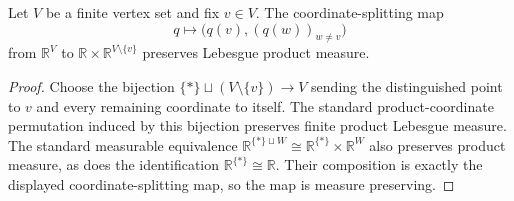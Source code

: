 \begin{helper}
Let \(V\) be a finite vertex set and fix \(v\in V\).  The coordinate-splitting
map
\[
q\longmapsto \bigl(q(v),(q(w))_{w\ne v}\bigr)
\]
from \(\mathbb R^V\) to \(\mathbb R\times\mathbb R^{V\setminus\{v\}}\)
preserves Lebesgue product measure.
\end{helper}
\begin{proof}
Choose the bijection \(\{\ast\}\sqcup (V\setminus\{v\})\to V\) sending the
distinguished point to \(v\) and every remaining coordinate to itself.  The
standard product-coordinate permutation induced by this bijection preserves
finite product Lebesgue measure.  The standard measurable equivalence
\(\mathbb R^{\{\ast\}\sqcup W}\cong \mathbb R^{\{\ast\}}\times\mathbb R^W\)
also preserves product measure, as does the identification
\(\mathbb R^{\{\ast\}}\cong\mathbb R\).  Their composition is exactly the
displayed coordinate-splitting map, so the map is measure preserving.
\end{proof}
